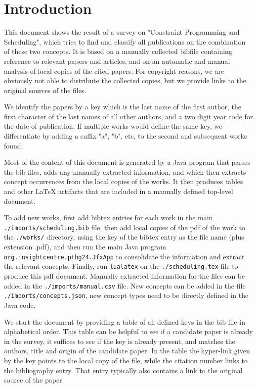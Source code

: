 \documentclass[a4paper]{article}
\begin{document}

\maketitle
\section{Introduction}

This document shows the result of a survey on "Constraint Programming and Scheduling", which tries to find and classify all publications on the combination of these two concepts. It is based on a manually collected bibfile containing reference to relevant papers and articles, and on an automatic and manual analysis of local copies of the cited papers. For copyright reasons, we are obviously not able to distribute the collected copies, but we provide links to the original sources of the files. 

We identify the papers by a key which is the last name of the first author, the first character of the last names of all other authors, and a two digit year code for the date of publication. If multiple works would define the same key, we differentiate by adding a suffix "a", "b", etc, to the second and subsequent works found.

Most of the content of this document is generated by a Java program that parses the bib files, adds any manually extracted information, and which then extracts concept occurrences from the local copies of the works. It then produces tables and other LaTeX  artifacts that are included in a manually defined top-level document.

To add new works, first add bibtex entries for each work in the main \texttt{./imports/scheduling.bib} file, then add local copies of the pdf of the work to the \texttt{./works/} directory, using the key of the bibtex entry as the file name (plus extension .pdf), and then run the main Java program \texttt{org.insightcentre.pthg24.JfxApp} to consolidate the information and extract the relevant concepts. Finally, run \texttt{lualatex} on the \texttt{./scheduling.tex} file to produce this pdf document. Manually extracted information for the files can be added in the \texttt{./imports/manual.csv} file. New concepts can be added in the file \texttt{./imports/concepts.json}, new concept types need to be directly defined in the Java code.

We start the document by providing a table of all defined keys in the bib file in alphabetical order. This table can be helpful to see if a candidate paper is already in the survey, it suffices to see if the key is already present, and matches the authors, title and origin of the candidate paper. In the table the hyper-link given by the key points to the local copy of the file, while the citation number links to the bibliography entry. That entry typically also contains a link to the original source of the paper.
\end{document}

